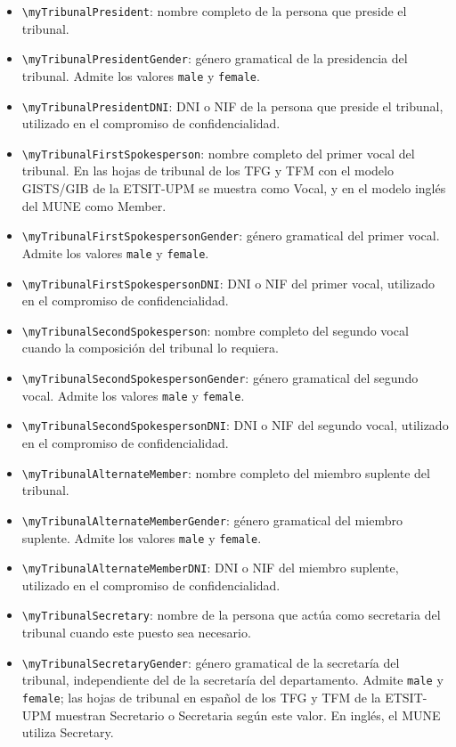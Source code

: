 \begin{itemize}
  \item \texttt{\textbackslash{}myTribunalPresident}: nombre completo de la persona que preside el tribunal.
  \item \texttt{\textbackslash{}myTribunalPresidentGender}: género gramatical de la presidencia del tribunal. Admite los valores \texttt{male} y \texttt{female}.
  \item \texttt{\textbackslash{}myTribunalPresidentDNI}: DNI o NIF de la persona que preside el tribunal, utilizado en el compromiso de confidencialidad.
  \item \texttt{\textbackslash{}myTribunalFirstSpokesperson}: nombre completo del primer vocal del tribunal. En las hojas de tribunal de los TFG y TFM con el modelo GISTS/GIB de la ETSIT-UPM se muestra como Vocal, y en el modelo inglés del MUNE como Member.
  \item \texttt{\textbackslash{}myTribunalFirstSpokespersonGender}: género gramatical del primer vocal. Admite los valores \texttt{male} y \texttt{female}.
  \item \texttt{\textbackslash{}myTribunalFirstSpokespersonDNI}: DNI o NIF del primer vocal, utilizado en el compromiso de confidencialidad.
  \item \texttt{\textbackslash{}myTribunalSecondSpokesperson}: nombre completo del segundo vocal cuando la composición del tribunal lo requiera.
  \item \texttt{\textbackslash{}myTribunalSecondSpokespersonGender}: género gramatical del segundo vocal. Admite los valores \texttt{male} y \texttt{female}.
  \item \texttt{\textbackslash{}myTribunalSecondSpokespersonDNI}: DNI o NIF del segundo vocal, utilizado en el compromiso de confidencialidad.
  \item \texttt{\textbackslash{}myTribunalAlternateMember}: nombre completo del miembro suplente del tribunal.
  \item \texttt{\textbackslash{}myTribunalAlternateMemberGender}: género gramatical del miembro suplente. Admite los valores \texttt{male} y \texttt{female}.
  \item \texttt{\textbackslash{}myTribunalAlternateMemberDNI}: DNI o NIF del miembro suplente, utilizado en el compromiso de confidencialidad.
  \item \texttt{\textbackslash{}myTribunalSecretary}: nombre de la persona que actúa como secretaria del tribunal cuando este puesto sea necesario.
  \item \texttt{\textbackslash{}myTribunalSecretaryGender}: género gramatical de la secretaría del tribunal, independiente del de la secretaría del departamento. Admite \texttt{male} y \texttt{female}; las hojas de tribunal en español de los TFG y TFM de la ETSIT-UPM muestran Secretario o Secretaria según este valor. En inglés, el MUNE utiliza Secretary.

\end{itemize}
